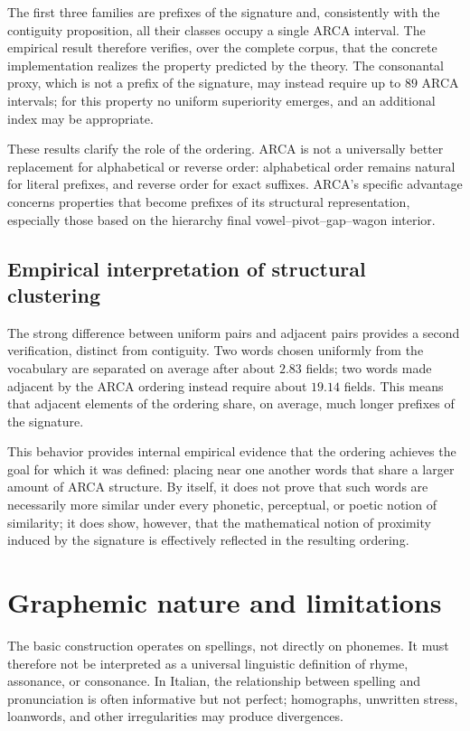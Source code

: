 \documentclass[11pt,a4paper]{article}
\theoremstyle{definition}
\theoremstyle{remark}
\begin{document}
The first three families are prefixes of the signature and, consistently with the contiguity proposition, all their classes occupy a single ARCA interval. The empirical result therefore verifies, over the complete corpus, that the concrete implementation realizes the property predicted by the theory. The consonantal proxy, which is not a prefix of the signature, may instead require up to $89$ ARCA intervals; for this property no uniform superiority emerges, and an additional index may be appropriate.

These results clarify the role of the ordering. ARCA is not a universally better replacement for alphabetical or reverse order: alphabetical order remains natural for literal prefixes, and reverse order for exact suffixes. ARCA's specific advantage concerns properties that become prefixes of its structural representation, especially those based on the hierarchy final vowel--pivot--gap--wagon interior.

\subsection{Empirical interpretation of structural clustering}

The strong difference between uniform pairs and adjacent pairs provides a second verification, distinct from contiguity. Two words chosen uniformly from the vocabulary are separated on average after about $2.83$ fields; two words made adjacent by the ARCA ordering instead require about $19.14$ fields. This means that adjacent elements of the ordering share, on average, much longer prefixes of the signature.

This behavior provides internal empirical evidence that the ordering achieves the goal for which it was defined: placing near one another words that share a larger amount of ARCA structure. By itself, it does not prove that such words are necessarily more similar under every phonetic, perceptual, or poetic notion of similarity; it does show, however, that the mathematical notion of proximity induced by the signature is effectively reflected in the resulting ordering.

\section{Graphemic nature and limitations}

The basic construction operates on spellings, not directly on phonemes. It must therefore not be interpreted as a universal linguistic definition of rhyme, assonance, or consonance. In Italian, the relationship between spelling and pronunciation is often informative but not perfect; homographs, unwritten stress, loanwords, and other irregularities may produce divergences.
\end{document}
